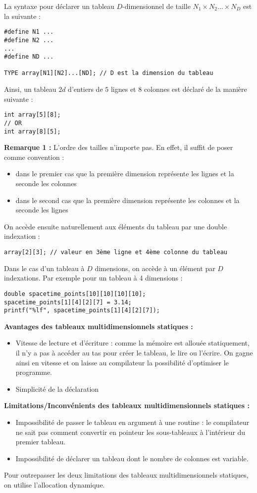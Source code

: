 \documentclass[../../../main.tex]{subfiles}
\begin{document}
La syntaxe pour déclarer un tableau $D$-dimensionnel de taille $N_{1}\times{N_{2}}\dots\times{N_{D}}$ est la suivante :
\begin{verbatim}
#define N1 ...
#define N2 ...
...
#define ND ...

TYPE array[N1][N2]...[ND]; // D est la dimension du tableau
\end{verbatim}
Ainsi, un tableau $2d$ d'entiers de $5$ lignes et 8 colonnes est déclaré de la manière suivante :
\begin{verbatim}
int array[5][8];
// OR
int array[8][5];
\end{verbatim}
\textbf{Remarque 1 :} L'ordre des tailles n'importe pas. En effet, il suffit de poser comme convention :
\begin{itemize}
	\item dans le premier cas que la première dimension représente les lignes et la seconde les colonnes
	\item dans le second cas que la première dimension représente les colonnes et la seconde les lignes
\end{itemize}
On accède ensuite naturellement aux éléments du tableau par une double indexation :
\begin{verbatim}
array[2][3]; // valeur en 3ème ligne et 4ème colonne du tableau
\end{verbatim}

Dans le cas d'un tableau à $D$ dimensions, on accède à un élément par $D$ indexations. Par exemple pour un tableau à 4 dimensions :
\begin{verbatim}
double spacetime_points[10][10][10][10];
spacetime_points[1][4][2][7] = 3.14;
printf("%lf", spacetime_points[1][4][2][7]);
\end{verbatim}
\textbf{Avantages des tableaux multidimensionnels statiques :}
\begin{itemize}
	\item Vitesse de lecture et d'écriture : comme la mémoire est allouée statiquement, il n'y a pas à accéder au tas pour créer le tableau, le lire ou l'écrire. On gagne ainsi en vitesse et on laisse au compilateur la possibilité d'optimiser le programme.
	\item Simplicité de la déclaration
\end{itemize}
\textbf{Limitations/Inconvénients des tableaux multidimensionnels statiques :}
\begin{itemize}
	\item Impossibilité de passer le tableau en argument à une routine : le compilateur ne sait pas comment convertir en pointeur les sous-tableaux à l'intérieur du premier tableau.
	\item Impossibilité de déclarer un tableau dont le nombre de colonnes est variable.
\end{itemize}
Pour outrepasser les deux limitations des tableaux multidimensionnels statiques, on utilise l'allocation dynamique.
\end{document}
